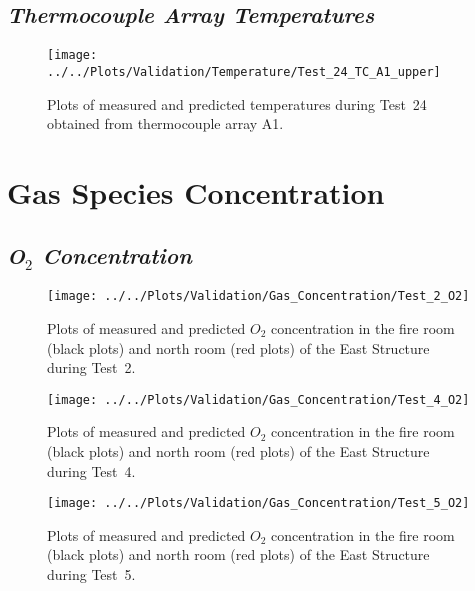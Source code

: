 \clearpage
\subsection*{\textit{Thermocouple Array Temperatures}}
\begin{figure}[!h]
	\centering
	\texttt{[image: ../../Plots/Validation/Temperature/Test\_24\_TC\_A1\_upper]}
	\caption[Plots of measured and predicted thermocouple array temperatures during Test~24.]{Plots of measured and predicted temperatures during Test~24 obtained from thermocouple array A1.}
	\label{fig:TCarray_data}
\end{figure}

\clearpage
\section{Gas Species Concentration}
\subsection*{\textit{O$_2$ Concentration}}
\begin{figure}[!h]
	\centering
	\texttt{[image: ../../Plots/Validation/Gas\_Concentration/Test\_2\_O2]}
	\caption[Plots of measured and predicted $O_2$ concentration during Test~2.]{Plots of measured and predicted $O_2$ concentration in the fire room (black plots) and north room (red plots) of the East Structure during Test~2.}
	\label{fig:Test2_O2}
\end{figure}

\begin{figure}[!h]
	\centering
	\texttt{[image: ../../Plots/Validation/Gas\_Concentration/Test\_4\_O2]}
	\caption[Plots of measured and predicted $O_2$ concentration during Test~4.]{Plots of measured and predicted $O_2$ concentration in the fire room (black plots) and north room (red plots) of the East Structure during Test~4.}
	\label{fig:Test4_O2}
\end{figure}

\begin{figure}[!h]
	\centering
	\texttt{[image: ../../Plots/Validation/Gas\_Concentration/Test\_5\_O2]}
	\caption[Plots of measured and predicted $O_2$ concentration during Test~5.]{Plots of measured and predicted $O_2$ concentration in the fire room (black plots) and north room (red plots) of the East Structure during Test~5.}
	\label{fig:Test5_O2}
\end{figure}


